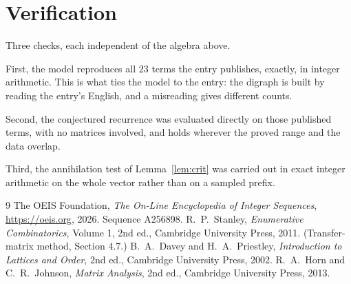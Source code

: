 \documentclass[11pt,a4paper]{article}
\theoremstyle{plain}
\theoremstyle{definition}
\begin{document}
\section{Verification}

Three checks, each independent of the algebra above.

First, the model reproduces all $23$ terms the entry publishes, exactly, in integer
arithmetic. This is what ties the model to the entry: the digraph is built by reading the
entry's English, and a misreading gives different counts.

Second, the conjectured recurrence was evaluated directly on those published terms, with no
matrices involved, and holds wherever the proved range and the data overlap.

Third, the annihilation test of Lemma~\ref{lem:crit} was carried out in exact integer
arithmetic on the whole vector rather than on a sampled prefix.

\begin{thebibliography}{9}
 The OEIS Foundation, \emph{The On-Line Encyclopedia of Integer
Sequences}, \url{https://oeis.org}, 2026. Sequence A256898.
 R.~P.~Stanley, \emph{Enumerative Combinatorics}, Volume 1, 2nd ed.,
Cambridge University Press, 2011. (Transfer-matrix method, Section 4.7.)
 B.~A.~Davey and H.~A.~Priestley, \emph{Introduction to Lattices and
Order}, 2nd ed., Cambridge University Press, 2002.
 R.~A.~Horn and C.~R.~Johnson, \emph{Matrix Analysis}, 2nd ed., Cambridge
University Press, 2013.
\end{thebibliography}
\end{document}
